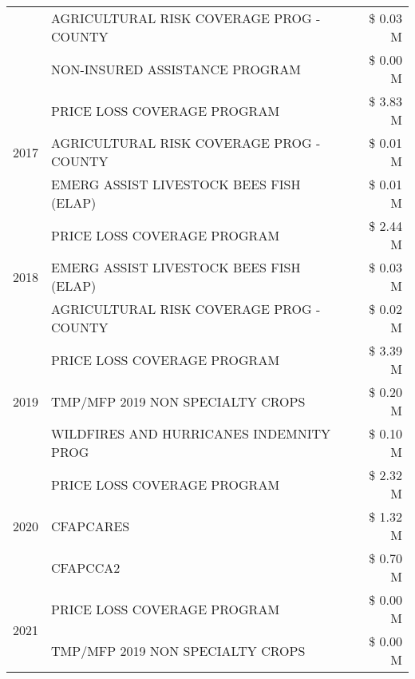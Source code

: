 \begin{tabular}{llr}
 & AGRICULTURAL RISK COVERAGE PROG - COUNTY & \$ 0.03 M \\
 & NON-INSURED ASSISTANCE PROGRAM & \$ 0.00 M \\
\cline{1-3}
\multirow[t]{3}{*}{2017} & PRICE LOSS COVERAGE PROGRAM & \$ 3.83 M \\
 & AGRICULTURAL RISK COVERAGE PROG - COUNTY & \$ 0.01 M \\
 & EMERG ASSIST LIVESTOCK BEES FISH (ELAP) & \$ 0.01 M \\
\cline{1-3}
\multirow[t]{3}{*}{2018} & PRICE LOSS COVERAGE PROGRAM & \$ 2.44 M \\
 & EMERG ASSIST LIVESTOCK BEES FISH (ELAP) & \$ 0.03 M \\
 & AGRICULTURAL RISK COVERAGE PROG - COUNTY & \$ 0.02 M \\
\cline{1-3}
\multirow[t]{3}{*}{2019} & PRICE LOSS COVERAGE PROGRAM & \$ 3.39 M \\
 & TMP/MFP 2019 NON SPECIALTY CROPS & \$ 0.20 M \\
 & WILDFIRES AND HURRICANES INDEMNITY PROG & \$ 0.10 M \\
\cline{1-3}
\multirow[t]{3}{*}{2020} & PRICE LOSS COVERAGE PROGRAM & \$ 2.32 M \\
 & CFAPCARES & \$ 1.32 M \\
 & CFAPCCA2 & \$ 0.70 M \\
\cline{1-3}
\multirow[t]{2}{*}{2021} & PRICE LOSS COVERAGE PROGRAM & \$ 0.00 M \\
 & TMP/MFP 2019 NON SPECIALTY CROPS & \$ 0.00 M \\
\cline{1-3}
\bottomrule
\end{tabular}
